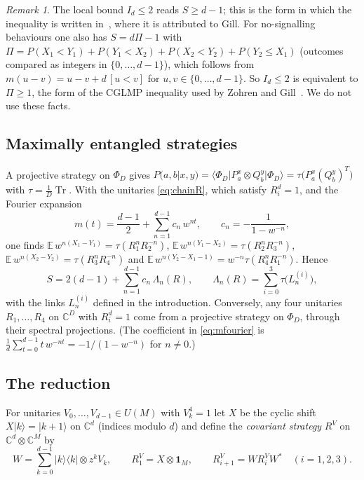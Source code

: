 \documentclass[11pt]{amsart}
\theoremstyle{definition}
\theoremstyle{remark}
\newtheorem{remark}[theorem]{Remark}
\newcommand{\C}{\mathbb{C}}
\newcommand{\Tr}{\operatorname{Tr}}
\newcommand{\one}{\mathbf{1}}
\begin{document}
\begin{remark}
The local bound $I_d\le2$ reads $S\ge d-1$; this is the form in which the inequality is written in~\cite{OQP},
where it is attributed to Gill. For no-signalling behaviours one also has $S=d\Pi-1$ with
$\Pi=P(X_1<Y_1)+P(Y_1<X_2)+P(X_2<Y_2)+P(Y_2\le X_1)$ (outcomes compared as integers in $\{0,\dots,d-1\}$), which
follows from $m(u-v)=u-v+d\,[u<v]$ for $u,v\in\{0,\dots,d-1\}$. So $I_d\le2$ is equivalent to $\Pi\ge1$, the form
of the CGLMP inequality used by Zohren and Gill~\cite[eq.~(3)]{ZG}. We do not use these facts.
\end{remark}

\subsection{Maximally entangled strategies}
A projective strategy on $\Phi_D$ gives $P(a,b|x,y)=\langle\Phi_D|P^x_a\otimes Q^y_b|\Phi_D\rangle
=\tau\bigl(P^x_a(Q^y_b)^T\bigr)$ with $\tau=\frac1D\Tr$. With the unitaries \eqref{eq:chainR}, which satisfy
$R_i^d=1$, and the Fourier expansion
\begin{equation}\label{eq:mfourier}
m(t)=\frac{d-1}{2}+\sum_{n=1}^{d-1}c_n\,w^{nt},\qquad c_n=-\frac{1}{1-w^{-n}},
\end{equation}
one finds $\mathbb{E}\,w^{n(X_1-Y_1)}=\tau(R_1^nR_2^{-n})$, $\mathbb{E}\,w^{n(Y_1-X_2)}=\tau(R_2^nR_3^{-n})$,
$\mathbb{E}\,w^{n(X_2-Y_2)}=\tau(R_3^nR_4^{-n})$ and $\mathbb{E}\,w^{n(Y_2-X_1-1)}=w^{-n}\tau(R_4^nR_1^{-n})$.
Hence
\begin{equation}\label{eq:Strace}
S=2(d-1)+\sum_{n=1}^{d-1}c_n\,\Lambda_n(R),\qquad
\Lambda_n(R)=\sum_{i=0}^{3}\tau\bigl(L^{(i)}_n\bigr),
\end{equation}
with the links $L^{(i)}_n$ defined in the introduction. Conversely, any four unitaries $R_1,\dots,R_4$ on $\C^D$
with $R_i^d=1$ come from a projective strategy on $\Phi_D$, through their spectral projections. (The coefficient
in \eqref{eq:mfourier} is $\frac1d\sum_{t=0}^{d-1}t\,w^{-nt}=-1/(1-w^{-n})$ for $n\ne0$.)

\subsection{The reduction}
For unitaries $V_0,\dots,V_{d-1}\in U(M)$ with $V_k^4=1$ let $X$ be the cyclic shift $X|k\rangle=|k+1\rangle$ on
$\C^d$ (indices modulo $d$) and define the \emph{covariant strategy} $R^V$ on $\C^d\otimes\C^M$ by
\begin{equation}\label{eq:covariant}
W=\sum_{k=0}^{d-1}|k\rangle\langle k|\otimes z^kV_k,\qquad R^V_1=X\otimes\one_M,\qquad
R^V_{i+1}=WR^V_iW^*\quad(i=1,2,3).
\end{equation}
\end{document}
